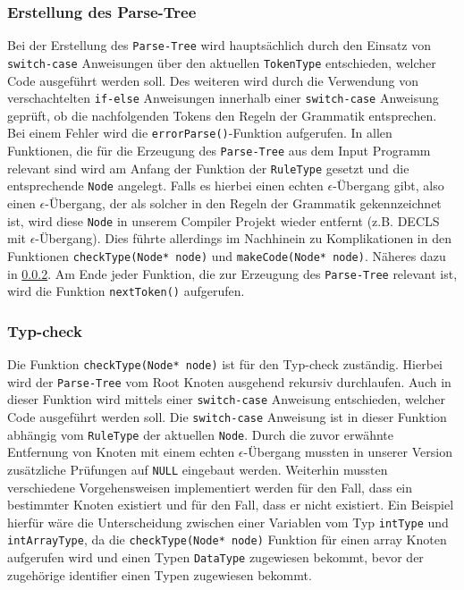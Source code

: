 \documentclass[
a4paper,   %
11pt,      %
oneside,   %
onecolumn, %
final      %
]{article}
\newcommand{\code}[1]{\lstinline$#1$}
\begin{document}
\subsubsection{Erstellung des Parse-Tree}
Bei der Erstellung des \code{Parse-Tree} wird hauptsächlich durch den Einsatz von \code{switch-case}
Anweisungen über den aktuellen \code{TokenType} entschieden, welcher Code ausgeführt werden soll. Des weiteren wird durch die Verwendung von verschachtelten \code{if-else} Anweisungen innerhalb einer \code{switch-case} Anweisung geprüft, ob die nachfolgenden Tokens den Regeln der Grammatik entsprechen. Bei einem Fehler wird die \code{errorParse()}-Funktion aufgerufen. In allen Funktionen, die für die Erzeugung des \code{Parse-Tree} aus dem Input Programm relevant sind wird am Anfang der Funktion der \code{RuleType} gesetzt und die entsprechende \code{Node} angelegt. Falls es hierbei einen echten $\epsilon$-Übergang gibt, also einen $\epsilon$-Übergang, der als solcher in den Regeln der Grammatik gekennzeichnet ist, wird diese \code{Node} in unserem Compiler Projekt wieder entfernt (z.B. DECLS mit $\epsilon$-Übergang). Dies führte allerdings im Nachhinein zu Komplikationen in den Funktionen \code{checkType(Node* node)} und \code{makeCode(Node* node)}. Näheres dazu in \ref{ssec:tCheck}. Am Ende jeder Funktion, die zur Erzeugung des \code{Parse-Tree} relevant ist, wird die Funktion \code{nextToken()} aufgerufen.

\subsubsection{Typ-check} \label{ssec:tCheck}
Die Funktion \code{checkType(Node* node)} ist für den Typ-check zuständig. Hierbei wird der \code{Parse-Tree} vom Root Knoten ausgehend rekursiv durchlaufen. Auch in dieser Funktion wird mittels einer \code{switch-case} Anweisung entschieden, welcher Code ausgeführt werden soll. Die \code{switch-case} Anweisung ist in dieser Funktion abhängig vom \code{RuleType} der aktuellen \code{Node}.
Durch die zuvor erwähnte Entfernung von Knoten mit einem echten $\epsilon$-Übergang mussten in unserer Version zusätzliche Prüfungen auf \code{NULL} eingebaut werden. Weiterhin mussten verschiedene Vorgehensweisen implementiert werden für den Fall, dass ein bestimmter Knoten existiert und für den Fall, dass er nicht existiert. Ein Beispiel hierfür wäre die Unterscheidung zwischen einer Variablen vom Typ \code{intType} und \code{intArrayType}, da die \code{checkType(Node* node)} Funktion für einen array Knoten aufgerufen wird und einen 
\newline
Typen \code{DataType} zugewiesen bekommt, bevor der zugehörige identifier einen Typen zugewiesen bekommt.
\end{document}
